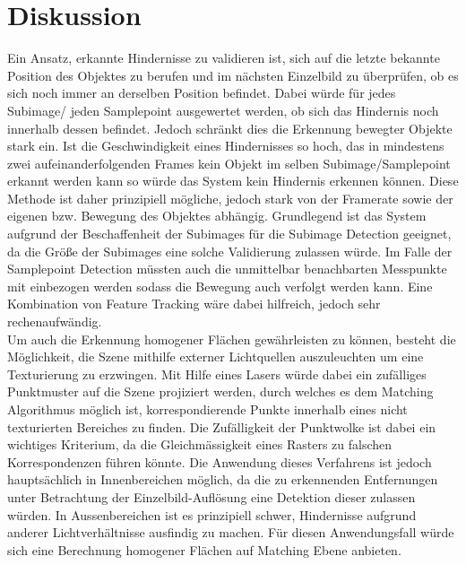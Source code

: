 \section{Diskussion}
\label{sec:conflict_discussion}
Ein Ansatz, erkannte Hindernisse zu validieren ist, sich auf die letzte bekannte Position des Objektes zu berufen und im nächsten Einzelbild zu überprüfen, ob es sich noch immer an derselben Position befindet. Dabei würde für jedes Subimage/ jeden Samplepoint ausgewertet werden, ob sich das Hindernis noch innerhalb dessen befindet. Jedoch schränkt dies die Erkennung bewegter Objekte stark ein. Ist die Geschwindigkeit eines Hindernisses so hoch, das in mindestens zwei aufeinanderfolgenden Frames kein Objekt im selben Subimage/Samplepoint erkannt werden kann so würde das System kein Hindernis erkennen können. Diese Methode ist daher prinzipiell mögliche, jedoch stark von der Framerate sowie der eigenen bzw. Bewegung des Objektes abhängig. Grundlegend ist das System aufgrund der Beschaffenheit der Subimages für die Subimage Detection geeignet, da die Größe der Subimages eine solche Validierung zulassen würde. Im Falle der Samplepoint Detection müssten auch die unmittelbar benachbarten Messpunkte mit einbezogen werden sodass die Bewegung auch verfolgt werden kann. Eine Kombination von Feature Tracking wäre dabei hilfreich, jedoch sehr rechenaufwändig.\\

\noindent
Um auch die Erkennung homogener Flächen gewährleisten zu können, besteht die Möglichkeit, die Szene mithilfe externer Lichtquellen auszuleuchten um eine Texturierung zu erzwingen. Mit Hilfe eines Lasers würde dabei ein zufälliges Punktmuster auf die Szene projiziert werden, durch welches es dem Matching Algorithmus möglich ist, korrespondierende Punkte innerhalb eines nicht texturierten Bereiches zu finden. Die Zufälligkeit der Punktwolke ist dabei ein wichtiges Kriterium, da die Gleichmässigkeit eines Rasters zu falschen Korrespondenzen führen könnte. Die Anwendung dieses Verfahrens ist jedoch hauptsächlich in Innenbereichen möglich, da die zu erkennenden Entfernungen unter Betrachtung der Einzelbild-Auflösung eine Detektion dieser zulassen würden. In Aussenbereichen ist es prinzipiell schwer, Hindernisse aufgrund anderer Lichtverhältnisse ausfindig zu machen. Für diesen Anwendungsfall würde sich eine Berechnung homogener Flächen auf Matching Ebene anbieten.\\

